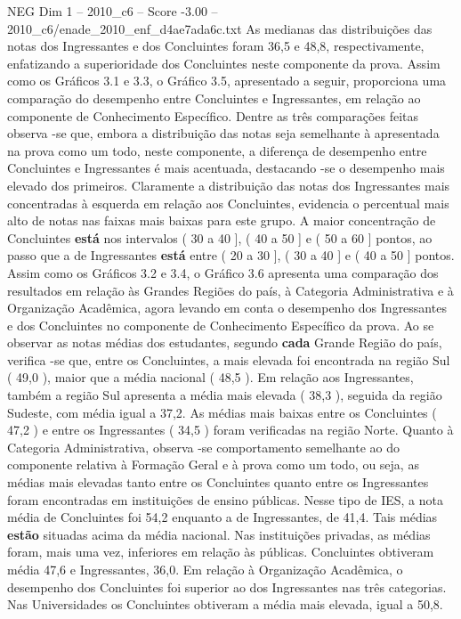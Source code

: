 \begin{textsample}{NEG Dim 1 – 2010\_c6 – Score -3.00 – 2010\_c6/enade\_2010\_enf\_d4ae7ada6c.txt}
As medianas das distribuições das notas dos Ingressantes e dos Concluintes foram 36,5 e 48,8, respectivamente, enfatizando a superioridade dos Concluintes neste componente da prova.
Assim como os Gráficos 3.1 e 3.3, o Gráfico 3.5, apresentado a seguir, proporciona uma comparação do desempenho entre Concluintes e Ingressantes, em relação ao componente de Conhecimento Específico.
Dentre as três comparações feitas observa -se que, embora a distribuição das notas seja semelhante à apresentada na prova como um todo, neste componente, a diferença de desempenho entre Concluintes e Ingressantes é mais acentuada, destacando -se o desempenho mais elevado dos primeiros.
Claramente a distribuição das notas dos Ingressantes mais concentradas à esquerda em relação aos Concluintes, evidencia o percentual mais alto de notas nas faixas mais baixas para este grupo.
A maior concentração de Concluintes \textbf{está} nos intervalos ( 30 a 40 ], ( 40 a 50 ] e ( 50 a 60 ] pontos, ao passo que a de Ingressantes \textbf{está} entre ( 20 a 30 ], ( 30 a 40 ] e ( 40 a 50 ] pontos.
Assim como os Gráficos 3.2 e 3.4, o Gráfico 3.6 apresenta uma comparação dos resultados em relação às Grandes Regiões do país, à Categoria Administrativa e à Organização Acadêmica, agora levando em conta o desempenho dos Ingressantes e dos Concluintes no componente de Conhecimento Específico da prova.
Ao se observar as notas médias dos estudantes, segundo \textbf{cada} Grande Região do país, verifica -se que, entre os Concluintes, a mais elevada foi encontrada na região Sul ( 49,0 ), maior que a média nacional ( 48,5 ).
Em relação aos Ingressantes, também a região Sul apresenta a média mais elevada ( 38,3 ), seguida da região Sudeste, com média igual a 37,2.
As médias mais baixas entre os Concluintes ( 47,2 ) e entre os Ingressantes ( 34,5 ) foram verificadas na região Norte.
Quanto à Categoria Administrativa, observa -se comportamento semelhante ao do componente relativa à Formação Geral e à prova como um todo, ou seja, as médias mais elevadas tanto entre os Concluintes quanto entre os Ingressantes foram encontradas em instituições de ensino públicas.
Nesse tipo de IES, a nota média de Concluintes foi 54,2 enquanto a de Ingressantes, de 41,4.
Tais médias \textbf{estão} situadas acima da média nacional.
Nas instituições privadas, as médias foram, mais uma vez, inferiores em relação às públicas.
Concluintes obtiveram média 47,6 e Ingressantes, 36,0.
Em relação à Organização Acadêmica, o desempenho dos Concluintes foi superior ao dos Ingressantes nas três categorias.
Nas Universidades os Concluintes obtiveram a média mais elevada, igual a 50,8.

\end{textsample}
